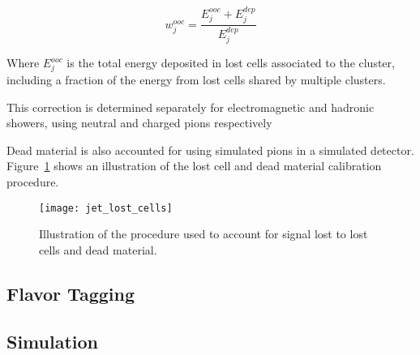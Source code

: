 \begin{equation}\label{eq:out_of_cluster}
    w_{j}^{ooc} = \frac{E_j^{ooc}+E^{dep}_j}{E^{dep}_j}
\end{equation}

Where $E_j^{ooc}$ is the total energy deposited in lost cells associated to the cluster, including a fraction
of the energy from lost cells shared by multiple clusters.

This correction is determined separately for electromagnetic and hadronic showers, using neutral and charged pions
respectively\cite{jet-topo-cluster}

\label{subsub:dead_material}

Dead material is also accounted for using simulated pions in a simulated detector.
Figure~\ref{fig:jet_lost_cells} shows an illustration of the lost cell and dead material calibration procedure.

\begin{figure}[h!]
    \centering
\texttt{[image: jet\_lost\_cells]}
\caption{Illustration of the procedure used to account for signal lost to lost cells and dead material.}
\label{fig:jet_lost_cells}\cite{jet-topo-cluster}
\end{figure}

\subsection{Flavor Tagging}\label{subsec:jet_flavor_tagging}
\subsection{Simulation}\label{subsec:jet_full_vs_fast_sim}